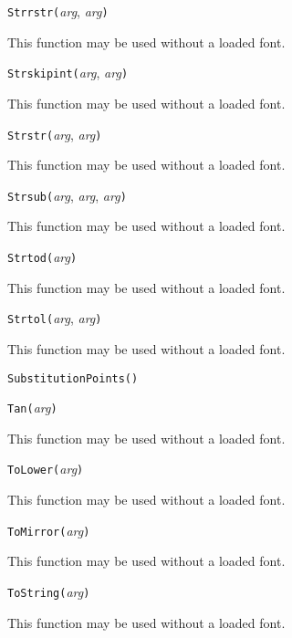 
\noindent\texttt{Strrstr(}\textit{arg}, \textit{arg}\texttt{)}

This function may be used without a loaded font.


\noindent\texttt{Strskipint(}\textit{arg}, \textit{arg}\texttt{)}

This function may be used without a loaded font.


\noindent\texttt{Strstr(}\textit{arg}, \textit{arg}\texttt{)}

This function may be used without a loaded font.


\noindent\texttt{Strsub(}\textit{arg}, \textit{arg}, \textit{arg}\texttt{)}

This function may be used without a loaded font.


\noindent\texttt{Strtod(}\textit{arg}\texttt{)}

This function may be used without a loaded font.


\noindent\texttt{Strtol(}\textit{arg}, \textit{arg}\texttt{)}

This function may be used without a loaded font.


\noindent\texttt{SubstitutionPoints(}\texttt{)}


\noindent\texttt{Tan(}\textit{arg}\texttt{)}

This function may be used without a loaded font.


\noindent\texttt{ToLower(}\textit{arg}\texttt{)}

This function may be used without a loaded font.


\noindent\texttt{ToMirror(}\textit{arg}\texttt{)}

This function may be used without a loaded font.


\noindent\texttt{ToString(}\textit{arg}\texttt{)}

This function may be used without a loaded font.

